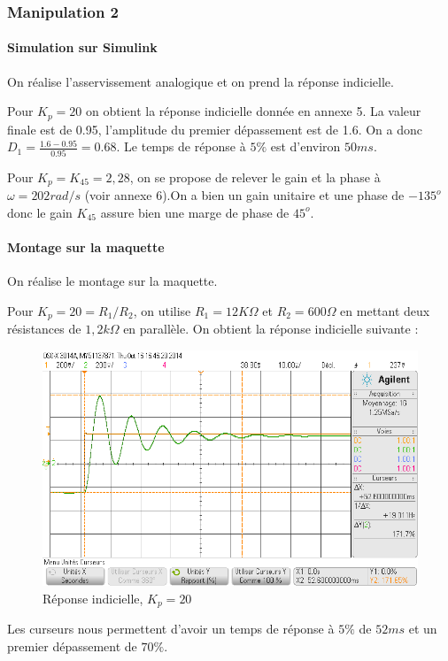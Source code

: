 \documentclass[../../Cours_M1.tex]{subfiles}
\begin{document}
\clearpage
\subsubsection*{Manipulation 2}
\paragraph{Simulation sur Simulink} On réalise l'asservissement analogique et on prend la réponse indicielle. 

Pour $K_p = 20$ on obtient la réponse indicielle donnée en annexe 5. La valeur finale est de 0.95, l'amplitude du premier dépassement est de 1.6. On a donc $D_1=\frac{1.6-0.95}{0.95}=0.68$. Le temps de réponse à $5\%$ est d'environ $50ms$.

Pour $K_p = K_{45} = 2,28$, on se propose de relever le gain et la phase à $\omega=202rad/s$ (voir annexe 6).On a bien un gain unitaire et une phase de $-135^o$ donc le gain $K_{45}$ assure bien une marge de phase de $45^o$.

\paragraph{Montage sur la maquette}
On réalise le montage sur la maquette. 

Pour $K_p=20=R_1/R_2$, on utilise $R_1=12K\Omega$ et $R_2=600\Omega$ en mettant deux résistances de $1,2k\Omega$ en parallèle.
On obtient la réponse indicielle suivante :
\begin{figure}[h!]
\centering
\includegraphics[scale=0.5]{m2Kp20.png}
\caption{Réponse indicielle, $K_p=20$}
\end{figure}

Les curseurs nous permettent d'avoir un temps de réponse à $5\%$ de $52ms$ et un premier dépassement de $70\%$.
\end{document}
